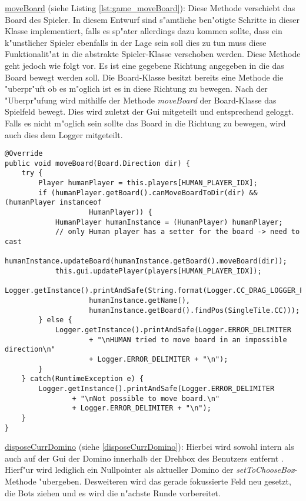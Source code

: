 \underline{moveBoard} (siehe Listing \ref{lst:game_moveBoard}): Diese Methode verschiebt das Board des Spieler. In diesem Entwurf sind s"amtliche ben"otigte Schritte in dieser Klasse implementiert, falls es sp"ater allerdings dazu kommen sollte, dass ein k"unstlicher Spieler ebenfalls in der Lage sein soll dies zu tun muss diese Funktionalit"at in die abstrakte Spieler-Klasse verschoben werden. Diese Methode geht jedoch wie folgt vor. Es ist eine gegebene Richtung angegeben in die das Board bewegt werden soll. Die Board-Klasse besitzt bereits eine Methode die "uberpr"uft ob es m"oglich ist es in diese Richtung zu bewegen. Nach der "Uberpr"ufung wird mithilfe der Methode \emph{moveBoard} der Board-Klasse das Spielfeld bewegt. Dies wird zuletzt der Gui mitgeteilt und entsprechend geloggt. Falls es nicht m"oglich sein sollte das Board in die Richtung zu bewegen, wird auch dies dem Logger mitgeteilt. 

\begin{lstlisting}[float,style=CodeHighlighting,caption=Game - moveBoard,label=lst:game_moveBoard]
@Override
public void moveBoard(Board.Direction dir) {
    try {
        Player humanPlayer = this.players[HUMAN_PLAYER_IDX];
        if (humanPlayer.getBoard().canMoveBoardToDir(dir) && (humanPlayer instanceof 
        			HumanPlayer)) {
            HumanPlayer humanInstance = (HumanPlayer) humanPlayer; 
            // only Human player has a setter for the board -> need to cast
            humanInstance.updateBoard(humanInstance.getBoard().moveBoard(dir));
            this.gui.updatePlayer(players[HUMAN_PLAYER_IDX]);
            Logger.getInstance().printAndSafe(String.format(Logger.CC_DRAG_LOGGER_FORMAT,
                    humanInstance.getName(), 
                    humanInstance.getBoard().findPos(SingleTile.CC)));
        } else {
            Logger.getInstance().printAndSafe(Logger.ERROR_DELIMITER
                    + "\nHUMAN tried to move board in an impossible direction\n" 
                    + Logger.ERROR_DELIMITER + "\n");
        }
    } catch(RuntimeException e) {
        Logger.getInstance().printAndSafe(Logger.ERROR_DELIMITER 
        		+ "\nNot possible to move board.\n"
                + Logger.ERROR_DELIMITER + "\n");
    }
}
\end{lstlisting}

\underline{disposeCurrDomino} (siehe \ref{disposeCurrDomino}): Hierbei wird sowohl intern als auch auf der Gui der Domino innerhalb der Drehbox des Benutzers entfernt . Hierf"ur wird lediglich ein Nullpointer als aktueller Domino der \emph{setToChooseBox}-Methode "ubergeben. Desweiteren wird das gerade fokussierte Feld neu gesetzt, die Bots ziehen und es wird die n"achste Runde vorbereitet. 

